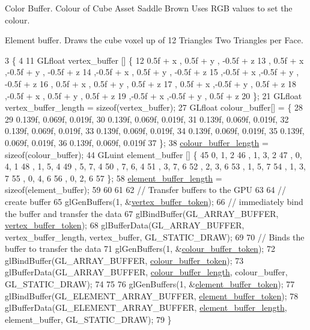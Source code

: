 Color Buffer. Colour of Cube Asset Saddle Brown Uses R\+G\+B values to set the colour.

Element buffer. Draws the cube voxel up of 12 Triangles Two Triangles per Face.
\begin{DoxyCode}
3                                                      \{
4 
11   GLfloat vertex\_buffer [] \{
12       0.5f + x  , 0.5f + y  , -0.5f + z
13     , 0.5f + x  ,-0.5f + y  , -0.5f + z
14     ,-0.5f + x  , 0.5f + y  , -0.5f + z
15     ,-0.5f + x  ,-0.5f + y  , -0.5f + z
16     , 0.5f + x  , 0.5f + y  ,  0.5f + z 
17     , 0.5f + x  ,-0.5f + y  ,  0.5f + z
18     ,-0.5f + x  , 0.5f + y  ,  0.5f + z
19     ,-0.5f + x  ,-0.5f + y  ,  0.5f + z
20   \};
21   GLfloat vertex\_buffer\_length = \textcolor{keyword}{sizeof}(vertex\_buffer);
27   GLfloat colour\_buffer[] = \{
28 
29      0.139f, 0.069f, 0.019f,
30      0.139f, 0.069f, 0.019f,
31      0.139f, 0.069f, 0.019f,
32      0.139f, 0.069f, 0.019f,
33      0.139f, 0.069f, 0.019f,
34      0.139f, 0.069f, 0.019f,
35      0.139f, 0.069f, 0.019f,
36      0.139f, 0.069f, 0.019f
37   \};
38   \hyperlink{classCubeAsset_a12de81acb020b82bd26cda6284910012}{colour\_buffer\_length} = \textcolor{keyword}{sizeof}(colour\_buffer);
44   GLuint element\_buffer []  \{
45       0, 1, 2   
46     , 1, 3, 2
47     , 0, 4, 1   
48     , 1, 5, 4   
49     , 5, 7, 4   
50     , 7, 6, 4   
51     , 3, 7, 6   
52     , 2, 3, 6   
53     , 1, 5, 7   
54     , 1, 3, 7   
55     , 0, 4, 6   
56     , 0, 2, 6   
57   \};
58   \hyperlink{classCubeAsset_ac66c2ec869f392515dad4ebda1fe4792}{element\_buffer\_length} = \textcolor{keyword}{sizeof}(element\_buffer);
59 
60 
61 
62   \textcolor{comment}{// Transfer buffers to the GPU}
63 
64   \textcolor{comment}{// create buffer}
65   glGenBuffers(1, &\hyperlink{classCubeAsset_a31bd098f60e2c24988316a9cc9335987}{vertex\_buffer\_token});
66   \textcolor{comment}{// immediately bind the buffer and transfer the data}
67   glBindBuffer(GL\_ARRAY\_BUFFER, \hyperlink{classCubeAsset_a31bd098f60e2c24988316a9cc9335987}{vertex\_buffer\_token});
68   glBufferData(GL\_ARRAY\_BUFFER, vertex\_buffer\_length, vertex\_buffer, GL\_STATIC\_DRAW);
69   
70   \textcolor{comment}{// Binds the buffer to transfer the data}
71   glGenBuffers(1, &\hyperlink{classCubeAsset_a75f98d346175cd91cdee04f1885f5327}{colour\_buffer\_token});
72   glBindBuffer(GL\_ARRAY\_BUFFER, \hyperlink{classCubeAsset_a75f98d346175cd91cdee04f1885f5327}{colour\_buffer\_token});
73   glBufferData(GL\_ARRAY\_BUFFER, \hyperlink{classCubeAsset_a12de81acb020b82bd26cda6284910012}{colour\_buffer\_length}, colour\_buffer, GL\_STATIC\_DRAW);
74 
75 
76   glGenBuffers(1, &\hyperlink{classCubeAsset_a4fae699256e7c5633a8174a93ca8a0ec}{element\_buffer\_token});
77   glBindBuffer(GL\_ELEMENT\_ARRAY\_BUFFER, \hyperlink{classCubeAsset_a4fae699256e7c5633a8174a93ca8a0ec}{element\_buffer\_token});
78   glBufferData(GL\_ELEMENT\_ARRAY\_BUFFER, \hyperlink{classCubeAsset_ac66c2ec869f392515dad4ebda1fe4792}{element\_buffer\_length}, element\_buffer, 
      GL\_STATIC\_DRAW);
79 \}
\end{DoxyCode}
\hypertarget{classCubeAsset_ab3ab9a5da82cbf8537a28652410093b1}{}
